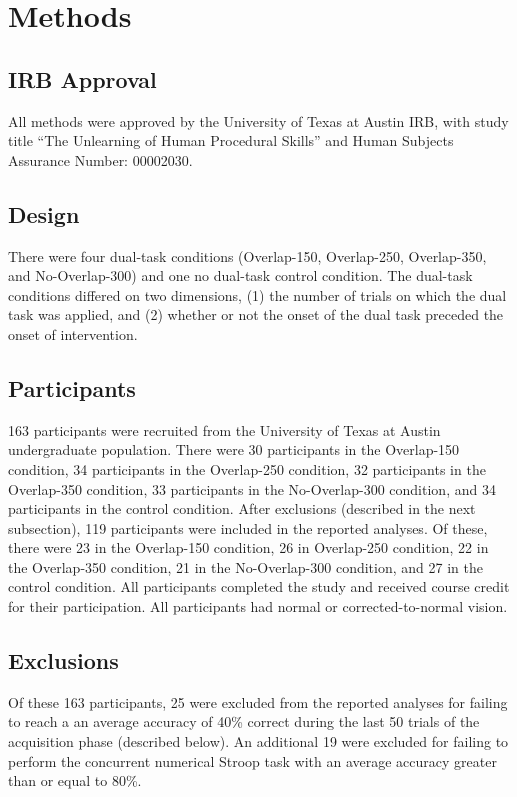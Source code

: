 \documentclass[apacite,draftfirst,jou]{apa6}
\begin{document}
\section*{Methods}
\subsection*{IRB Approval}
All methods were approved by the University of Texas at Austin IRB, with study
title ``The Unlearning of Human Procedural Skills'' and Human Subjects Assurance
Number: 00002030.

\subsection*{Design} There were four dual-task conditions (Overlap-150,
Overlap-250, Overlap-350, and No-Overlap-300) and one no dual-task control
condition. The dual-task conditions differed on two dimensions, (1) the number
of trials on which the dual task was applied, and (2) whether or not the onset
of the dual task preceded the onset of intervention.

\subsection*{Participants} 163 participants were recruited from the University
of Texas at Austin undergraduate population. There were 30 participants in the
Overlap-150 condition, 34 participants in the Overlap-250 condition, 32
participants in the Overlap-350 condition, 33 participants in the No-Overlap-300
condition, and 34 participants in the control condition. After exclusions
(described in the next subsection), 119 participants were included in the
reported analyses. Of these, there were 23 in the Overlap-150 condition, 26 in
Overlap-250 condition, 22 in the Overlap-350 condition, 21 in the No-Overlap-300
condition, and 27 in the control condition. All participants completed the study
and received course credit for their participation. All participants had normal
or corrected-to-normal vision.

\subsection*{Exclusions}
Of these 163 participants, 25 were excluded from the reported analyses for
failing to reach a an average accuracy of 40\% correct during the last 50 trials
of the acquisition phase (described below). An additional 19 were excluded for
failing to perform the concurrent numerical Stroop task with an average accuracy
greater than or equal to 80\%.
\end{document}

